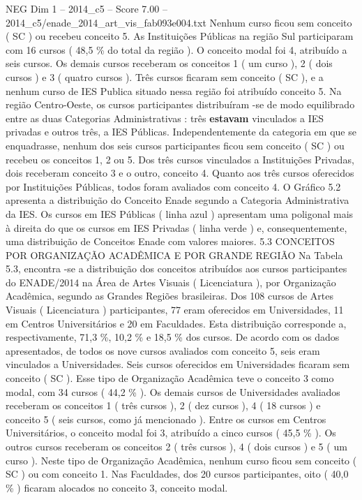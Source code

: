 \begin{textsample}{NEG Dim 1 – 2014\_c5 – Score 7.00 – 2014\_c5/enade\_2014\_art\_vis\_fab093e004.txt}
Nenhum curso ficou sem conceito ( SC ) ou recebeu conceito 5.
As Instituições Públicas na região Sul participaram com 16 cursos ( 48,5 \% do total da região ).
O conceito modal foi 4, atribuído a seis cursos.
Os demais cursos receberam os conceitos 1 ( um curso ), 2 ( dois cursos ) e 3 ( quatro cursos ).
Três cursos ficaram sem conceito ( SC ), e a nenhum curso de IES Publica situado nessa região foi atribuído conceito 5.
Na região Centro-Oeste, os cursos participantes distribuíram -se de modo equilibrado entre as duas Categorias Administrativas : três \textbf{estavam} vinculados a IES privadas e outros três, a IES Públicas.
Independentemente da categoria em que se enquadrasse, nenhum dos seis cursos participantes ficou sem conceito ( SC ) ou recebeu os conceitos 1, 2 ou 5.
Dos três cursos vinculados a Instituições Privadas, dois receberam conceito 3 e o outro, conceito 4.
Quanto aos três cursos oferecidos por Instituições Públicas, todos foram avaliados com conceito 4.
O Gráfico 5.2 apresenta a distribuição do Conceito Enade segundo a Categoria Administrativa da IES.
Os cursos em IES Públicas ( linha azul ) apresentam uma poligonal mais à direita do que os cursos em IES Privadas ( linha verde ) e, consequentemente, uma distribuição de Conceitos Enade com valores maiores. 5.3 CONCEITOS POR ORGANIZAÇÃO ACADÊMICA E POR GRANDE REGIÃO Na Tabela 5.3, encontra -se a distribuição dos conceitos atribuídos aos cursos participantes do ENADE/2014 na Área de Artes Visuais ( Licenciatura ), por Organização Acadêmica, segundo as Grandes Regiões brasileiras.
Dos 108 cursos de Artes Visuais ( Licenciatura ) participantes, 77 eram oferecidos em Universidades, 11 em Centros Universitários e 20 em Faculdades.
Esta distribuição corresponde a, respectivamente, 71,3 \%, 10,2 \% e 18,5 \% dos cursos.
De acordo com os dados apresentados, de todos os nove cursos avaliados com conceito 5, seis eram vinculados a Universidades.
Seis cursos oferecidos em Universidades ficaram sem conceito ( SC ).
Esse tipo de Organização Acadêmica teve o conceito 3 como modal, com 34 cursos ( 44,2 \% ).
Os demais cursos de Universidades avaliados receberam os conceitos 1 ( três cursos ), 2 ( dez cursos ), 4 ( 18 cursos ) e conceito 5 ( seis cursos, como já mencionado ).
Entre os cursos em Centros Universitários, o conceito modal foi 3, atribuído a cinco cursos ( 45,5 \% ).
Os outros cursos receberam os conceitos 2 ( três cursos ), 4 ( dois cursos ) e 5 ( um curso ).
Neste tipo de Organização Acadêmica, nenhum curso ficou sem conceito ( SC ) ou com conceito 1.
Nas Faculdades, dos 20 cursos participantes, oito ( 40,0 \% ) ficaram alocados no conceito 3, conceito modal.

\end{textsample}

